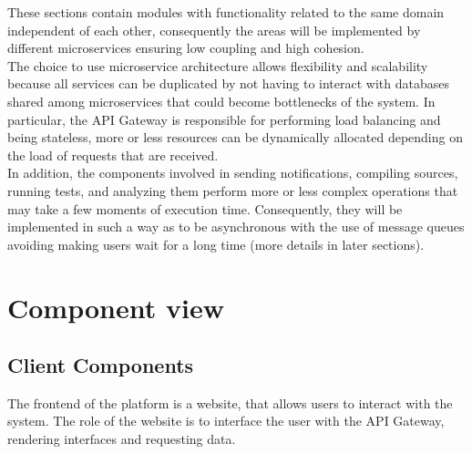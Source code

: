 These sections contain modules with functionality related to the same domain independent of each other, consequently the areas will be implemented by different microservices ensuring low coupling and high cohesion.\\
The choice to use microservice architecture allows flexibility and scalability because all services can be duplicated by not having to interact with databases shared among microservices that could become bottlenecks of the system.
In particular, the API Gateway is responsible for performing load balancing and being stateless, more or less resources can be dynamically allocated depending on the load of requests that are received.\\
In addition, the components involved in sending notifications, compiling sources, running tests, and analyzing them perform more or less complex operations that may take a few moments of execution time.
Consequently, they will be implemented in such a way as to be asynchronous with the use of message queues avoiding making users wait for a long time (more details in later sections).


\section{Component view}
\begin{adjustbox}{
        max size={\textwidth}{},
        center,
        caption={Component view diagram},
        label={fig:Component view diagram},
        figure=H}
\end{adjustbox}

\subsection{Client Components}
The frontend of the platform is a website, that allows users to interact with the system.
The role of the website is to interface the user with the API Gateway, rendering interfaces and requesting data.

